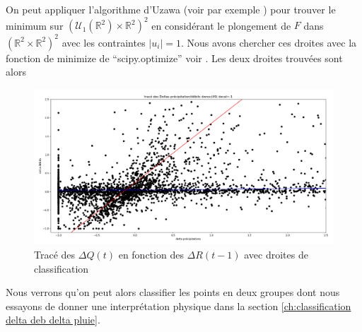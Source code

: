 \documentclass[a4paper,11pt]{article}
\numberwithin{equation}{section}
\begin{document}
On peut appliquer l'algorithme d'Uzawa (voir par exemple \cite{boyd2004convex}) pour trouver le minimum sur  $(\mathcal{U}_1(\mathbb{R}^2)\times\mathbb{R}^2)^2$ en considérant le plongement de $F$ dans  $(\mathbb{R}^2\times\mathbb{R}^2)^2$ avec les contraintes $|u_i|=1$. Nous avons chercher ces droites avec la fonction de minimize de ``scipy.optimize'' voir \cite{scipy}. Les deux droites trouvées sont alors 

\begin{figure}[H]
	\label{fig-deb delta Q delta R avec droites}
	\begin{center}
		\includegraphics[scale=0.28]{deb_prec_dec1_droites.png}
	\end{center}
	\caption{Tracé des $\Delta Q(t)$ en fonction des $\Delta R(t-1)$ avec droites de classification}
\end{figure}

Nous verrons qu'on peut alors classifier les points en deux groupes dont nous essayons de donner une interprétation physique dans la section \ref{ch:classification delta deb delta pluie}.  

\newpage

 

\end{document}
